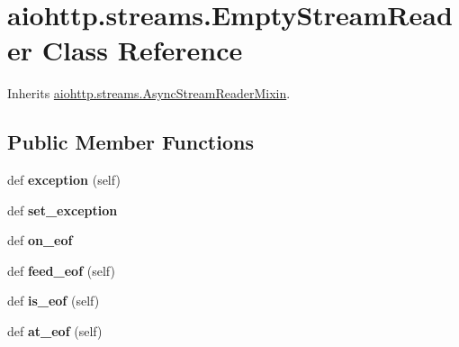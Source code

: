 \hypertarget{classaiohttp_1_1streams_1_1_empty_stream_reader}{}\section{aiohttp.\+streams.\+Empty\+Stream\+Reader Class Reference}
\label{classaiohttp_1_1streams_1_1_empty_stream_reader}


Inherits \hyperlink{classaiohttp_1_1streams_1_1_async_stream_reader_mixin}{aiohttp.\+streams.\+Async\+Stream\+Reader\+Mixin}.

\subsection*{Public Member Functions}
\begin{DoxyCompactItemize}
\item 
\mbox{\label{classaiohttp_1_1streams_1_1_empty_stream_reader_a1aa5c8c37cc1c05e7390714910151857}} 
def {\bfseries exception} (self)
\item 
\mbox{\label{classaiohttp_1_1streams_1_1_empty_stream_reader_a03532b3e88805101956dec3d81692c08}} 
def {\bfseries set\+\_\+exception}
\item 
\mbox{\label{classaiohttp_1_1streams_1_1_empty_stream_reader_a91924e869c2479448027c9fb3bb37a86}} 
def {\bfseries on\+\_\+eof}
\item 
\mbox{\label{classaiohttp_1_1streams_1_1_empty_stream_reader_a271873c03d0d20ff1e2a42b414cf793f}} 
def {\bfseries feed\+\_\+eof} (self)
\item 
\mbox{\label{classaiohttp_1_1streams_1_1_empty_stream_reader_aaf44ed73b67bd40a7c4f26b29bad558e}} 
def {\bfseries is\+\_\+eof} (self)
\item 
\mbox{\label{classaiohttp_1_1streams_1_1_empty_stream_reader_ae71c8e88f36ecb9665e649c38d75d463}} 
def {\bfseries at\+\_\+eof} (self)
\item 

\end{DoxyCompactItemize}
